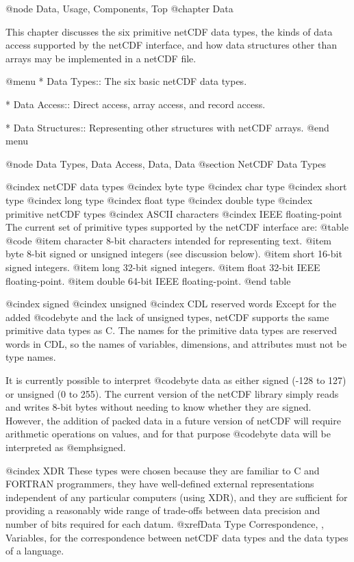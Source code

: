 @node Data, Usage, Components, Top
@chapter Data

This chapter discusses the six primitive netCDF data types, the kinds of
data access supported by the netCDF interface, and how data structures other
than arrays may be implemented in a netCDF file.

@menu
* Data Types::                  The six basic netCDF data types.

* Data Access::                 Direct access, array access, and record access.

* Data Structures::             Representing other structures with netCDF arrays.
@end menu

@node Data Types, Data Access, Data, Data
@section NetCDF Data Types

@cindex netCDF data types
@cindex byte type
@cindex char type
@cindex short type
@cindex long type
@cindex float type
@cindex double type
@cindex primitive netCDF types
@cindex ASCII characters
@cindex IEEE floating-point
The current set of primitive types supported by the netCDF interface are:
@table @code
@item character
8-bit characters intended for representing text.
@item byte
8-bit signed or unsigned integers (see discussion below).
@item short
16-bit signed integers.
@item long
32-bit signed integers.
@item float
32-bit IEEE floating-point.
@item double
64-bit IEEE floating-point.
@end table

@cindex signed
@cindex unsigned
@cindex CDL reserved words
Except for the added @code{byte} and the lack of
unsigned types, netCDF supports the same primitive data types as C.  The
names for the primitive data types are reserved words in CDL, so the
names of variables, dimensions, and attributes must not be type names.

It is currently possible to interpret @code{byte} data as either signed (-128
to 127) or unsigned (0 to 255).
The current version of the netCDF library simply reads and writes 8-bit
bytes without needing to know whether they are signed.
However, the addition of packed data in a future version of netCDF
will require arithmetic operations on values, and for that purpose
@code{byte} data will be interpreted as @emph{signed}.

@cindex XDR
These types were chosen because they are familiar to C and FORTRAN
programmers, they have well-defined external representations independent
of any particular computers (using XDR), and they are sufficient for
providing a reasonably wide range of trade-offs between data precision
and number of bits required for each datum.
@xref{Data Type Correspondence, , Variables}, for the correspondence
between netCDF data types and the data types of a language.

